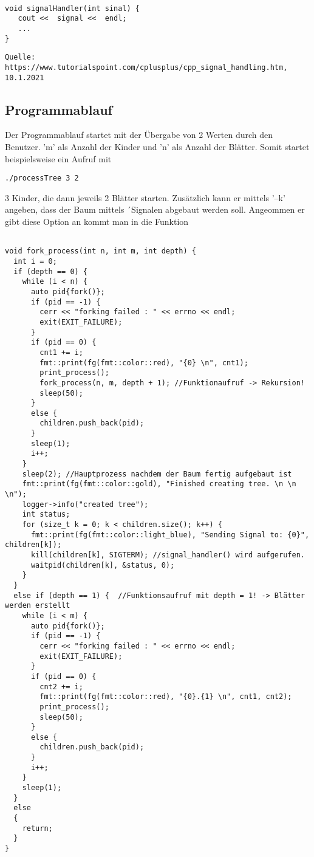 \documentclass{article}
\begin{document}
\begin{verbatim}

void signalHandler(int sinal) {
   cout <<  signal <<  endl;
   ...
}

\end{verbatim} 

\begin{verbatim}
Quelle: https://www.tutorialspoint.com/cplusplus/cpp_signal_handling.htm,
10.1.2021
\end{verbatim} 

\subsection{Programmablauf}
Der Programmablauf startet mit der Übergabe von 2 Werten durch den Benutzer. 'm' als Anzahl der Kinder und 'n' als Anzahl der Blätter.
Somit startet beispielsweise ein Aufruf mit 
\begin{verbatim}
./processTree 3 2
\end{verbatim} 
3 Kinder, die dann jeweils 2 Blätter starten.
\newline
\newline
Zusätzlich kann er mittels '--k' angeben, dass der Baum mittels ´Signalen abgebaut werden soll.
\newline
Angeommen er gibt diese Option an kommt man in die Funktion 
\begin{verbatim}

void fork_process(int n, int m, int depth) {
  int i = 0;
  if (depth == 0) {
    while (i < n) {
      auto pid{fork()};
      if (pid == -1) {
        cerr << "forking failed : " << errno << endl;
        exit(EXIT_FAILURE);
      }
      if (pid == 0) {
        cnt1 += i;
        fmt::print(fg(fmt::color::red), "{0} \n", cnt1);
        print_process();
        fork_process(n, m, depth + 1); //Funktionaufruf -> Rekursion! 
        sleep(50);
      }
      else {
        children.push_back(pid);
      }
      sleep(1);
      i++;
    }
    sleep(2); //Hauptprozess nachdem der Baum fertig aufgebaut ist
    fmt::print(fg(fmt::color::gold), "Finished creating tree. \n \n \n");
    logger->info("created tree");
    int status;
    for (size_t k = 0; k < children.size(); k++) {
      fmt::print(fg(fmt::color::light_blue), "Sending Signal to: {0}", children[k]);
      kill(children[k], SIGTERM); //signal_handler() wird aufgerufen.
      waitpid(children[k], &status, 0);  
    }
  }
  else if (depth == 1) {  //Funktionsaufruf mit depth = 1! -> Blätter werden erstellt
    while (i < m) {
      auto pid{fork()};
      if (pid == -1) {
        cerr << "forking failed : " << errno << endl;
        exit(EXIT_FAILURE);
      }
      if (pid == 0) {
        cnt2 += i;
        fmt::print(fg(fmt::color::red), "{0}.{1} \n", cnt1, cnt2);
        print_process();
        sleep(50);
      }
      else {
        children.push_back(pid);
      }
      i++;
    }
    sleep(1);
  }
  else
  {
    return;
  }
}

\end{verbatim} 
\end{document}
